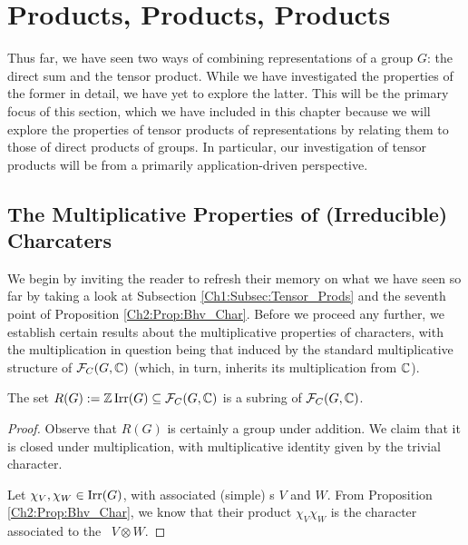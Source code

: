 \section{Products, Products, Products}\label{Ch3:Sec:Products}

Thus far, we have seen two ways of combining representations of a group $G$: the direct sum and the tensor product. While we have investigated the properties of the former in detail, we have yet to explore the latter. This will be the primary focus of this section, which we have included in this chapter because we will explore the properties of tensor products of representations by relating them to those of direct products of groups. In particular, our investigation of tensor products will be from a primarily application-driven perspective.

\subsection{The Multiplicative Properties of (Irreducible) Charcaters}

We begin by inviting the reader to refresh their memory on what we have seen so far by taking a look at Subsection \ref{Ch1:Subsec:Tensor_Prods} and the seventh point of Proposition \ref{Ch2:Prop:Bhv_Char}. Before we proceed any further, we establish certain results about the multiplicative properties of characters, with the multiplication in question being that induced by the standard multiplicative structure of $\mathcal{F}_C\!\left( G, \mathbb{C} \right)$ (which, in turn, inherits its multiplication from $\mathbb{C}$).


\begin{lemma}
    The set $R(G) := \mathbb{Z} \operatorname{Irr}\!\left( G \right) \subseteq \mathcal{F}_C\!\left( G, \mathbb{C} \right)$ is a subring of $\mathcal{F}_C\!\left( G, \mathbb{C} \right)$.
\end{lemma}
\begin{proof}
    Observe that $R(G)$ is certainly a group under addition. We claim that it is closed under multiplication, with multiplicative identity given by the trivial character.
    
    Let $\chi_V, \chi_W \in \operatorname{Irr}\!\left( G \right)$, with associated (simple) \CGM s $V$ and $W$. From Proposition \ref{Ch2:Prop:Bhv_Char}, we know that their product $\chi_V \chi_W$ is the character associated to the \CGM\ $V \otimes W$. %
\end{proof}

